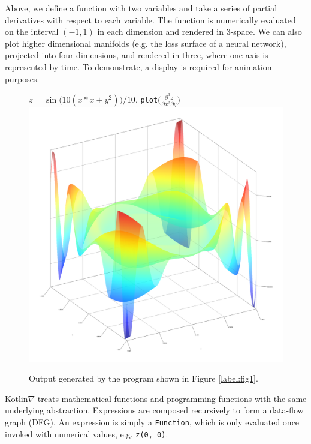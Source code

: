 \documentclass{article}
\newcommand{\squeezeup}{\vspace{-2.5mm}}
\begin{document}
    \squeezeup Above, we define a function with two variables and take a series of partial derivatives with respect to each variable. The function is numerically evaluated on the interval $(-1, 1)$ in each dimension and rendered in 3-space. We can also plot higher dimensional manifolds (e.g. the loss surface of a neural network), projected into four dimensions, and rendered in three, where one axis is represented by time. To demonstrate, a display is required for animation purposes.

    \squeezeup\begin{figure}[!htb]
                  \centering $z = \sin{\big(10(x*x + y^2)\big)} / 10$, \texttt{plot}$\Big(\frac{\partial^3z}{\partial{x^2}\partial{y}}\Big)$
                  \includegraphics[scale=0.43]{plot_result.png}
                  \squeezeup\caption{Output generated by the program shown in Figure \ref{label:fig1}.}\squeezeup
    \end{figure}

    Kotlin$\nabla$ treats mathematical functions and programming functions with the same underlying abstraction. Expressions are composed recursively to form a data-flow graph (DFG). An expression is simply a \texttt{Function}, which is only evaluated once invoked with numerical values, e.g. \texttt{z(0, 0)}.
\end{document}
